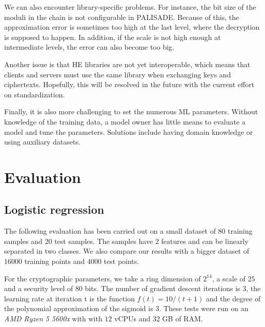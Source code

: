\documentclass[a4paper,11pt,oneside]{report}
\begin{document}
We can also encounter library-specific problems. 
For instance, the bit size of the moduli in the chain is not configurable in PALISADE. 
Because of this, the approximation error is sometimes too high at the last level, where the decryption is supposed to happen.
In addition, if the scale is not high enough at intermediate levels, the error can also become too big.

Another issue is that HE libraries are not yet interoperable, which means that clients and servers must use the same library when exchanging keys and ciphertexts. 
Hopefully, this will be resolved in the future with the current effort on standardization.

Finally, it is also more challenging to set the numerous ML parameters.
Without knowledge of the training data, a model owner has little means to evaluate a model and tune the parameters.
Solutions include having domain knowledge or using auxiliary datasets.


\chapter{Evaluation}\label{chap:evaluation}


\section{Logistic regression}\label{sec:eval_lr}

The following evaluation has been carried out on a small dataset of $80$ training samples and $20$ test samples. 
The samples have $2$ features and can be linearly separated in two classes.
We also compare our results with a bigger dataset of $16000$ training points and $4000$ test points.

For the cryptographic parameters, we take a ring dimension of $2^{14}$, a scale of $25$ and a security level of $80$ bits. 
The number of gradient descent iterations is $3$, the learning rate at iteration t is the function $f(t) = 10 / (t+1)$ and the degree of the polynomial approximation of the sigmoid is $3$.
These tests were run on an \emph{AMD Ryzen 5 5600x} with with $12$ vCPUs and $32$ GB of RAM.
\end{document}
